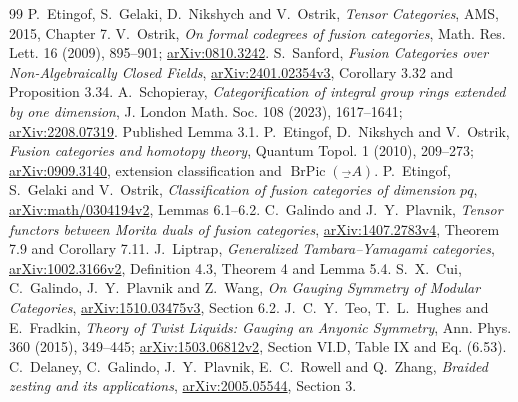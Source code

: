 \documentclass[11pt]{article}
\begin{document}
\begin{thebibliography}{99}\footnotesize\setlength{\itemsep}{2pt}\setlength{\parskip}{0pt}
 P.~Etingof, S.~Gelaki, D.~Nikshych and V.~Ostrik,
\emph{Tensor Categories}, AMS, 2015, Chapter 7.
 V.~Ostrik, \emph{On formal codegrees of fusion categories},
Math. Res. Lett. 16 (2009), 895--901; \href{https://arxiv.org/abs/0810.3242}{arXiv:0810.3242}.
 S.~Sanford, \emph{Fusion Categories over Non-Algebraically Closed Fields},
\href{https://arxiv.org/abs/2401.02354}{arXiv:2401.02354v3}, Corollary 3.32 and Proposition 3.34.
 A.~Schopieray, \emph{Categorification of integral group rings extended by one dimension},
J. London Math. Soc. 108 (2023), 1617--1641; \href{https://arxiv.org/abs/2208.07319}{arXiv:2208.07319}. Published Lemma 3.1.
 P.~Etingof, D.~Nikshych and V.~Ostrik,
\emph{Fusion categories and homotopy theory}, Quantum Topol. 1 (2010), 209--273;
\href{https://arxiv.org/abs/0909.3140}{arXiv:0909.3140}, extension classification and $\operatorname{BrPic}(\Vec_A)$.
 P.~Etingof, S.~Gelaki and V.~Ostrik,
\emph{Classification of fusion categories of dimension $pq$},
\href{https://arxiv.org/abs/math/0304194}{arXiv:math/0304194v2}, Lemmas 6.1--6.2.
 C.~Galindo and J.~Y.~Plavnik,
\emph{Tensor functors between Morita duals of fusion categories},
\href{https://arxiv.org/abs/1407.2783}{arXiv:1407.2783v4}, Theorem 7.9 and Corollary 7.11.
 J.~Liptrap, \emph{Generalized Tambara--Yamagami categories},
\href{https://arxiv.org/abs/1002.3166v2}{arXiv:1002.3166v2}, Definition 4.3, Theorem 4 and Lemma 5.4.
 S.~X.~Cui, C.~Galindo, J.~Y.~Plavnik and Z.~Wang,
\emph{On Gauging Symmetry of Modular Categories},
\href{https://arxiv.org/abs/1510.03475}{arXiv:1510.03475v3}, Section 6.2.
 J.~C.~Y.~Teo, T.~L.~Hughes and E.~Fradkin,
\emph{Theory of Twist Liquids: Gauging an Anyonic Symmetry},
Ann. Phys. 360 (2015), 349--445; \href{https://arxiv.org/abs/1503.06812}{arXiv:1503.06812v2}, Section VI.D, Table IX and Eq. (6.53).
 C.~Delaney, C.~Galindo, J.~Y.~Plavnik, E.~C.~Rowell and Q.~Zhang,
\emph{Braided zesting and its applications},
\href{https://arxiv.org/abs/2005.05544}{arXiv:2005.05544}, Section 3.
\end{thebibliography}
\end{document}
